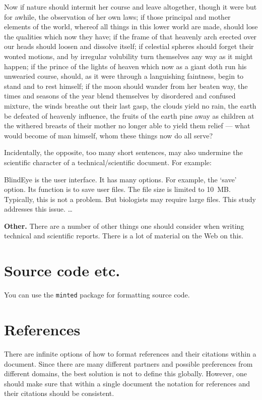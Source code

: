 \documentclass{newseye_del}
\begin{document}
Now if nature should intermit her course and leave altogether, though it were
but for awhile, the observation of her own laws; if those principal and mother
elements of the world, whereof all things in this lower world are made, should
lose the qualities which now they have; if the frame of that heavenly arch
erected over our heads should loosen and dissolve itself; if celestial spheres
should forget their wonted motions, and by irregular volubility turn themselves
any way as it might happen; if the prince of the lights of heaven which now as a
giant doth run his unwearied course, should, as it were through a languishing
faintness, begin to stand and to rest himself; if the moon should wander from
her beaten way, the times and seasons of the year blend themselves by disordered
and confused mixture, the winds breathe out their last gasp, the clouds yield no
rain, the earth be defeated of heavenly influence, the fruits of the earth pine
away as children at the withered breasts of their mother no longer able to yield
them relief --- what would become of man himself, whom these things now do all
serve?

Incidentally, the opposite, too many short sentences, may also undermine the
scientific character of a technical/scientific document. For example:

BlindEye is the user interface. It has many options. For example, the `save'
option. Its function is to save user files. The file size is limited to 10~MB.
Typically, this is not a problem. But biologists may require large files. This
study addresses this issue. \dots

\textbf{Other.} There are a number of other things one should consider when
writing technical and scientific reports. There is a lot of material on the Web
on this.

\section{Source code etc.}
You can use the \texttt{minted} package for formatting source code.


\section{References}
There are infinite options of how to format references and their citations
within a document. Since there are many different partners and possible
preferences from different domains, the best solution is not to define this
globally. However, one should make sure that within a single document the
notation for references and their citations should be consistent.
\end{document}
